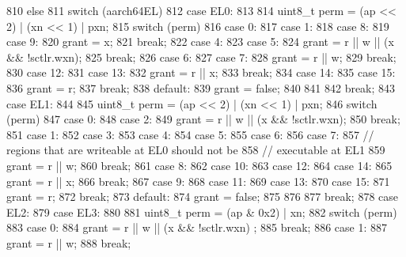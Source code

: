 \begin{DoxyCode}
{{810     } else {
811         switch (aarch64EL) {
812           case EL0:
813             {
814                 uint8_t perm = (ap << 2)  | (xn << 1) | pxn;
815                 switch (perm) {
816                   case 0:
817                   case 1:
818                   case 8:
819                   case 9:
820                     grant = x;
821                     break;
822                   case 4:
823                   case 5:
824                     grant = r || w || (x && !sctlr.wxn);
825                     break;
826                   case 6:
827                   case 7:
828                     grant = r || w;
829                     break;
830                   case 12:
831                   case 13:
832                     grant = r || x;
833                     break;
834                   case 14:
835                   case 15:
836                     grant = r;
837                     break;
838                   default:
839                     grant = false;
840                 }
841             }
842             break;
843           case EL1:
844             {
845                 uint8_t perm = (ap << 2)  | (xn << 1) | pxn;
846                 switch (perm) {
847                   case 0:
848                   case 2:
849                     grant = r || w || (x && !sctlr.wxn);
850                     break;
851                   case 1:
852                   case 3:
853                   case 4:
854                   case 5:
855                   case 6:
856                   case 7:
857                     // regions that are writeable at EL0 should not be
858                     // executable at EL1
859                     grant = r || w;
860                     break;
861                   case 8:
862                   case 10:
863                   case 12:
864                   case 14:
865                     grant = r || x;
866                     break;
867                   case 9:
868                   case 11:
869                   case 13:
870                   case 15:
871                     grant = r;
872                     break;
873                   default:
874                     grant = false;
875                 }
876             }
877             break;
878           case EL2:
879           case EL3:
880             {
881                 uint8_t perm = (ap & 0x2) | xn;
882                 switch (perm) {
883                   case 0:
884                     grant = r || w || (x && !sctlr.wxn) ;
885                     break;
886                   case 1:
887                     grant = r || w;
888                     break;
}}}}}
\end{DoxyCode}
